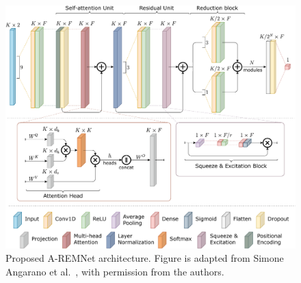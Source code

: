 \begin{figure}[thb]
\includegraphics[width=\textwidth]{Figures/methodology/remnet_compat.pdf}
\centering
\caption[Proposed A-REMNet architecture.]{Proposed A-REMNet architecture. Figure is adapted from Simone Angarano et al.~\cite{Simone2021UWB}, with permission from the authors.}
\label{fig:architecture}
\end{figure}

